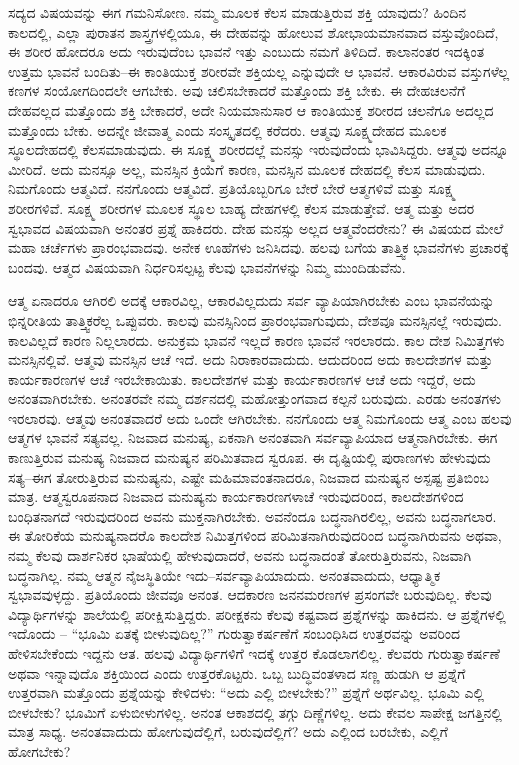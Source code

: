 ಸದ್ಯದ ವಿಷಯವನ್ನು ಈಗ ಗಮನಿಸೋಣ. ನಮ್ಮ ಮೂಲಕ ಕೆಲಸ ಮಾಡುತ್ತಿರುವ ಶಕ್ತಿ ಯಾವುದು? ಹಿಂದಿನ ಕಾಲದಲ್ಲಿ, ಎಲ್ಲಾ ಪುರಾತನ ಶಾಸ್ತ್ರಗಳಲ್ಲಿಯೂ, ಈ ದೇಹವನ್ನು ಹೋಲುವ ಶೋಭಾಯಮಾನವಾದ ವಸ್ತುವೊಂದಿದೆ, ಈ ಶರೀರ ಹೋದರೂ ಅದು ಇರುವುದೆಂಬ ಭಾವನೆ ಇತ್ತು ಎಂಬುದು ನಮಗೆ ತಿಳಿದಿದೆ. ಕಾಲಾನಂತರ ಇದಕ್ಕಿಂತ ಉತ್ತಮ ಭಾವನೆ ಬಂದಿತು–ಈ ಕಾಂತಿಯುಕ್ತ ಶರೀರವೇ ಶಕ್ತಿಯಲ್ಲ ಎನ್ನುವುದೇ ಆ ಭಾವನೆ. ಆಕಾರವಿರುವ ವಸ್ತುಗಳೆಲ್ಲ ಕಣಗಳ ಸಂಯೋಗದಿಂದಲೇ ಆಗಬೇಕು. ಅವು ಚಲಿಸಬೇಕಾದರೆ ಮತ್ತೊಂದು ಶಕ್ತಿ ಬೇಕು. ಈ ದೇಹಚಲನೆಗೆ ದೇಹವಲ್ಲದ ಮತ್ತೊಂದು ಶಕ್ತಿ ಬೇಕಾದರೆ, ಅದೇ ನಿಯಮಾನುಸಾರ ಆ ಕಾಂತಿಯುಕ್ತ ಶರೀರದ ಚಲನೆಗೂ ಅದಲ್ಲದ ಮತ್ತೊಂದು ಬೇಕು. ಅದನ್ನೇ ಜೀವಾತ್ಮ ಎಂದು ಸಂಸ್ಕೃತದಲ್ಲಿ ಕರೆದರು. ಆತ್ಮವು ಸೂಕ್ಷ್ಮದೇಹದ ಮೂಲಕ ಸ್ಥೂಲದೇಹದಲ್ಲಿ ಕೆಲಸಮಾಡುವುದು. ಈ ಸೂಕ್ಷ್ಮ ಶರೀರದಲ್ಲೆ ಮನಸ್ಸು ಇರುವುದೆಂದು ಭಾವಿಸಿದ್ದರು. ಆತ್ಮವು ಅದನ್ನೂ ಮೀರಿದೆ. ಅದು ಮನಸ್ಸೂ ಅಲ್ಲ, ಮನಸ್ಸಿನ ಕ್ರಿಯೆಗೆ ಕಾರಣ, ಮನಸ್ಸಿನ ಮೂಲಕ ದೇಹದಲ್ಲಿ ಕೆಲಸ ಮಾಡುವುದು. ನಿಮಗೊಂದು ಆತ್ಮವಿದೆ. ನನಗೊಂದು ಆತ್ಮವಿದೆ. ಪ್ರತಿಯೊಬ್ಬರಿಗೂ ಬೇರೆ ಬೇರೆ ಆತ್ಮಗಳಿವೆ ಮತ್ತು ಸೂಕ್ಷ್ಮ ಶರೀರಗಳಿವೆ. ಸೂಕ್ಷ್ಮ ಶರೀರಗಳ ಮೂಲಕ ಸ್ಥೂಲ ಬಾಹ್ಯ ದೇಹಗಳಲ್ಲಿ ಕೆಲಸ ಮಾಡುತ್ತೇವೆ. ಆತ್ಮ ಮತ್ತು ಅದರ ಸ್ವಭಾವದ ವಿಷಯವಾಗಿ ಅನಂತರ ಪ್ರಶ್ನೆ ಹಾಕಿದರು. ದೇಹ ಮನಸ್ಸು ಅಲ್ಲದ ಆತ್ಮವೆಂದರೇನು? ಈ ವಿಷಯದ ಮೇಲೆ ಮಹಾ ಚರ್ಚೆಗಳು ಪ್ರಾರಂಭವಾದವು. ಅನೇಕ ಊಹೆಗಳು ಜನಿಸಿದವು. ಹಲವು ಬಗೆಯ ತಾತ್ತ್ವಿಕ ಭಾವನೆಗಳು ಪ್ರಚಾರಕ್ಕೆ ಬಂದವು. ಆತ್ಮದ ವಿಷಯವಾಗಿ ನಿರ್ಧರಿಸಲ್ಪಟ್ಟ ಕೆಲವು ಭಾವನೆಗಳನ್ನು ನಿಮ್ಮ ಮುಂದಿಡುವೆನು.

ಆತ್ಮ ಏನಾದರೂ ಆಗಿರಲಿ ಅದಕ್ಕೆ ಆಕಾರವಿಲ್ಲ, ಆಕಾರವಿಲ್ಲದುದು ಸರ್ವ ವ್ಯಾಪಿಯಾಗಿರಬೇಕು ಎಂಬ ಭಾವನೆಯನ್ನು ಭಿನ್ನರೀತಿಯ ತಾತ್ತ್ವಿಕರೆಲ್ಲ ಒಪ್ಪುವರು. ಕಾಲವು ಮನಸ್ಸಿನಿಂದ ಪ್ರಾರಂಭವಾಗುವುದು, ದೇಶವೂ ಮನಸ್ಸಿನಲ್ಲೆ ಇರುವುದು. ಕಾಲವಿಲ್ಲದೆ ಕಾರಣ ನಿಲ್ಲಲಾರದು. ಅನುಕ್ರಮ ಭಾವನೆ ಇಲ್ಲದೆ ಕಾರಣ ಭಾವನೆ ಇರಲಾರದು. ಕಾಲ ದೇಶ ನಿಮಿತ್ತಗಳು ಮನಸ್ಸಿನಲ್ಲಿವೆ. ಆತ್ಮವು ಮನಸ್ಸಿನ ಆಚೆ ಇದೆ. ಅದು ನಿರಾಕಾರವಾದುದು. ಆದುದರಿಂದ ಅದು ಕಾಲದೇಶಗಳ ಮತ್ತು ಕಾರ್ಯಕಾರಣಗಳ ಆಚೆ ಇರಬೇಕಾಯಿತು. ಕಾಲದೇಶಗಳ ಮತ್ತು ಕಾರ್ಯಕಾರಣಗಳ ಆಚೆ ಅದು ಇದ್ದರೆ, ಅದು ಅನಂತವಾಗಿರಬೇಕು. ಅನಂತರವೇ ನಮ್ಮ ದರ್ಶನದಲ್ಲಿ ಮಹೋತ್ತುಂಗವಾದ ಕಲ್ಪನೆ ಬರುವುದು. ಎರಡು ಅನಂತಗಳು ಇರಲಾರವು. ಆತ್ಮವು ಅನಂತವಾದರೆ ಅದು ಒಂದೇ ಆಗಿರಬೇಕು. ನನಗೊಂದು ಆತ್ಮ ನಿಮಗೊಂದು ಆತ್ಮ ಎಂಬ ಹಲವು ಆತ್ಮಗಳ ಭಾವನೆ ಸತ್ಯವಲ್ಲ. ನಿಜವಾದ ಮನುಷ್ಯ, ಏಕನಾಗಿ ಅನಂತವಾಗಿ ಸರ್ವವ್ಯಾಪಿಯಾದ ಆತ್ಮನಾಗಿರಬೇಕು. ಈಗ ಕಾಣುತ್ತಿರುವ ಮನುಷ್ಯ ನಿಜವಾದ ಮನುಷ್ಯನ ಪರಿಮಿತವಾದ ಸ್ವರೂಪ. ಈ ದೃಷ್ಟಿಯಲ್ಲಿ ಪುರಾಣಗಳು ಹೇಳುವುದು ಸತ್ಯ–ಈಗ ತೋರುತ್ತಿರುವ ಮನುಷ್ಯನು, ಎಷ್ಟೇ ಮಹಿಮಾವಂತನಾದರೂ, ನಿಜವಾದ ಮನುಷ್ಯನ ಅಸ್ಪಷ್ಟ ಪ್ರತಿಬಿಂಬ ಮಾತ್ರ. ಆತ್ಮಸ್ವರೂಪನಾದ ನಿಜವಾದ ಮನುಷ್ಯನು ಕಾರ್ಯಕಾರಣಗಳಾಚೆ ಇರುವುದರಿಂದ, ಕಾಲದೇಶಗಳಿಂದ ಬಂಧಿತನಾಗದೆ ಇರುವುದರಿಂದ ಅವನು ಮುಕ್ತನಾಗಿರಬೇಕು. ಅವನೆಂದೂ ಬದ್ಧನಾಗಿರಲಿಲ್ಲ, ಅವನು ಬದ್ಧನಾಗಲಾರ. ಈ ತೋರಿಕೆಯ ಮನುಷ್ಯನಾದರೊ ಕಾಲದೇಶ ನಿಮಿತ್ತಗಳಿಂದ ಪರಿಮಿತನಾಗಿರುವುದರಿಂದ ಬದ್ಧನಾಗಿರುವನು ಅಥವಾ, ನಮ್ಮ ಕೆಲವು ದಾರ್ಶನಿಕರ ಭಾಷೆಯಲ್ಲಿ ಹೇಳುವುದಾದರೆ, ಅವನು ಬದ್ಧನಾದಂತೆ ತೋರುತ್ತಿರುವನು, ನಿಜವಾಗಿ ಬದ್ಧನಾಗಿಲ್ಲ. ನಮ್ಮ ಆತ್ಮನ ನೈಜಸ್ಥಿತಿಯೇ ಇದು–ಸರ್ವವ್ಯಾಪಿಯಾದುದು. ಅನಂತವಾದುದು, ಆಧ್ಯಾತ್ಮಿಕ ಸ್ವಭಾವವುಳ್ಳದ್ದು. ಪ್ರತಿಯೊಂದು ಜೀವವೂ ಅನಂತ. ಆದಕಾರಣ ಜನನಮರಣಗಳ ಪ್ರಸಂಗವೇ ಬರುವುದಿಲ್ಲ. ಕೆಲವು ವಿದ್ಯಾರ್ಥಿಗಳನ್ನು ಶಾಲೆಯಲ್ಲಿ ಪರೀಕ್ಷಿಸುತ್ತಿದ್ದರು. ಪರೀಕ್ಷಕನು ಕೆಲವು ಕಷ್ಟವಾದ ಪ್ರಶ್ನೆಗಳನ್ನು ಹಾಕಿದನು. ಆ ಪ್ರಶ್ನೆಗಳಲ್ಲಿ ಇದೊಂದು – “ಭೂಮಿ ಏತಕ್ಕೆ ಬೀಳುವುದಿಲ್ಲ?” ಗುರುತ್ವಾಕರ್ಷಣೆಗೆ ಸಂಬಂಧಿಸಿದ ಉತ್ತರವನ್ನು ಅವರಿಂದ ಹೇಳಿಸಬೇಕೆಂದು ಇದ್ದನು ಆತ. ಹಲವು ವಿದ್ಯಾರ್ಥಿಗಳಿಗೆ ಇದಕ್ಕೆ ಉತ್ತರ ಕೊಡಲಾಗಲಿಲ್ಲ. ಕೆಲವರು ಗುರುತ್ವಾಕರ್ಷಣೆ ಅಥವಾ ಇನ್ನಾವುದೊ ಶಕ್ತಿಯಿಂದ ಎಂದು ಉತ್ತರಕೊಟ್ಟರು. ಒಬ್ಬ ಬುದ್ಧಿವಂತಳಾದ ಸಣ್ಣ ಹುಡುಗಿ ಆ ಪ್ರಶ್ನೆಗೆ ಉತ್ತರವಾಗಿ ಮತ್ತೊಂದು ಪ್ರಶ್ನೆಯನ್ನು ಕೇಳಿದಳು: “ಅದು ಎಲ್ಲಿ ಬೀಳಬೇಕು?” ಪ್ರಶ್ನೆಗೆ ಅರ್ಥವಿಲ್ಲ. ಭೂಮಿ ಎಲ್ಲಿ ಬೀಳಬೇಕು? ಭೂಮಿಗೆ ಏಳುಬೀಳುಗಳಿಲ್ಲ. ಅನಂತ ಆಕಾಶದಲ್ಲಿ ತಗ್ಗು ದಿಣ್ಣೆಗಳಿಲ್ಲ. ಅದು ಕೇವಲ ಸಾಪೇಕ್ಷ ಜಗತ್ತಿನಲ್ಲಿ ಮಾತ್ರ ಸಾಧ್ಯ. ಅನಂತವಾದುದು ಹೋಗುವುದೆಲ್ಲಿಗೆ, ಬರುವುದೆಲ್ಲಿಗೆ? ಅದು ಎಲ್ಲಿಂದ ಬರಬೇಕು, ಎಲ್ಲಿಗೆ ಹೋಗಬೇಕು?

